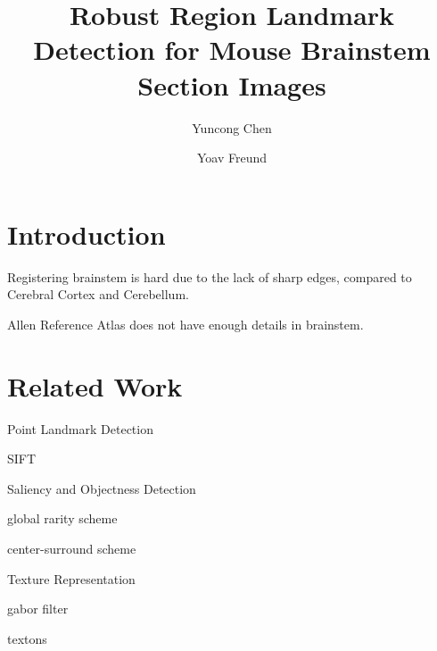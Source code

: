 \documentclass{llncs}
\begin{document}
%
%
\title{Robust Region Landmark Detection for Mouse Brainstem Section Images}
%
%
\author{Yuncong Chen \and Yoav Freund}
%
%
%

\maketitle              %

\begin{abstract}

\end{abstract}
%
\section{Introduction}
%

Registering brainstem is hard due to the lack of sharp edges, compared to Cerebral Cortex and Cerebellum.

Allen Reference Atlas does not have enough details in brainstem.

\section{Related Work}

\begin{description}

\item{Point Landmark Detection}

SIFT

\item{Saliency and Objectness Detection}

global rarity scheme

center-surround scheme

\item{Texture Representation}

gabor filter

textons

\end{description}
\end{document}
